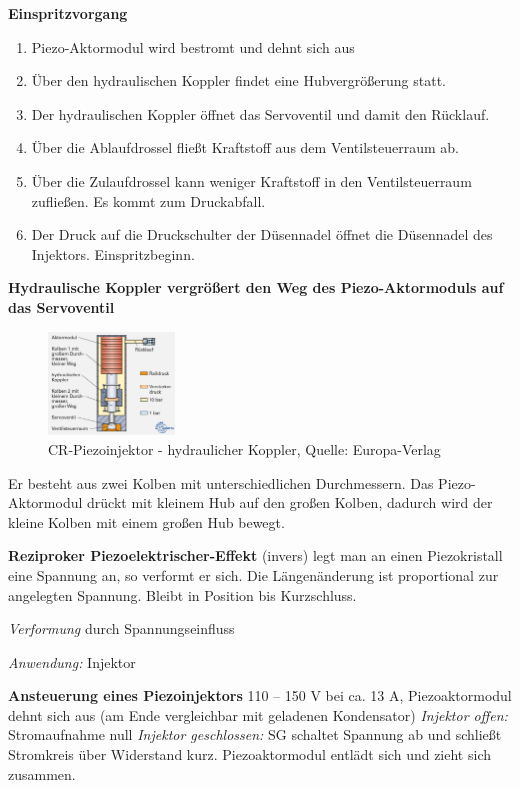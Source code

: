 \textbf{Einspritzvorgang}

\begin{enumerate}
\item
  Piezo-Aktormodul wird bestromt und dehnt sich aus
\item
  Über den hydraulischen Koppler findet eine Hubvergrößerung statt.
\item
  Der hydraulischen Koppler öffnet das Servoventil und damit den
  Rücklauf.
\item
  Über die Ablaufdrossel fließt Kraftstoff aus dem Ventilsteuerraum ab.
\item
  Über die Zulaufdrossel kann weniger Kraftstoff in den Ventilsteuerraum
  zufließen. Es kommt zum Druckabfall.
\item
  Der Druck auf die Druckschulter der Düsennadel öffnet die Düsennadel
  des Injektors. Einspritzbeginn.
\end{enumerate}

\textbf{Hydraulische Koppler vergrößert den Weg des Piezo-Aktormoduls
auf das Servoventil}

\begin{figure}[!ht]%
\centering
\includegraphics[width=0.3\textwidth]{images/Diesel/Diesel-21.pdf}
\caption{CR-Piezoinjektor - hydraulicher Koppler, Quelle: Europa-Verlag}
\end{figure}

Er besteht aus zwei Kolben mit unterschiedlichen Durchmessern. Das
Piezo-Aktormodul drückt mit kleinem Hub auf den großen Kolben, dadurch
wird der kleine Kolben mit einem großen Hub bewegt.

\textbf{Reziproker Piezoelektrischer-Effekt} (invers) legt man an einen
Piezokristall eine Spannung an, so verformt er sich. Die Längenänderung
ist proportional zur angelegten Spannung. Bleibt in Position bis
Kurzschluss.

\emph{Verformung} durch Spannungseinfluss

\emph{Anwendung:} Injektor

\textbf{Ansteuerung eines Piezoinjektors} 110 -- 150 V bei ca. 13 A,
Piezoaktormodul dehnt sich aus (am Ende vergleichbar mit geladenen
Kondensator) \emph{Injektor offen:} Stromaufnahme null \emph{Injektor
geschlossen:} SG schaltet Spannung ab und schließt Stromkreis über
Widerstand kurz. Piezoaktormodul entlädt sich und zieht sich zusammen.

